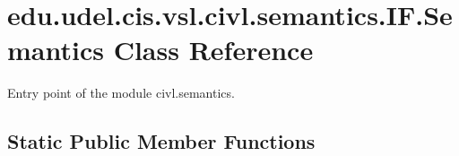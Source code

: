\hypertarget{classedu_1_1udel_1_1cis_1_1vsl_1_1civl_1_1semantics_1_1IF_1_1Semantics}{}\section{edu.\+udel.\+cis.\+vsl.\+civl.\+semantics.\+I\+F.\+Semantics Class Reference}
\label{classedu_1_1udel_1_1cis_1_1vsl_1_1civl_1_1semantics_1_1IF_1_1Semantics}


Entry point of the module civl.\+semantics.  


\subsection*{Static Public Member Functions}
